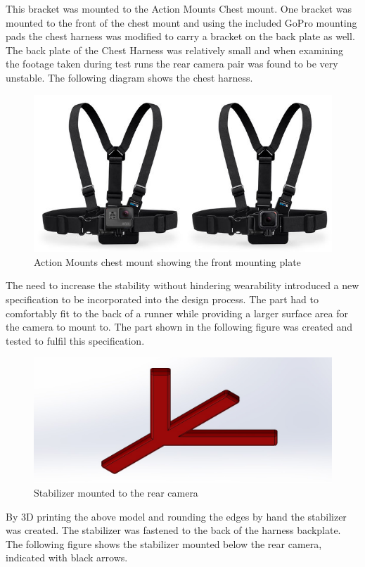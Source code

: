 This bracket was mounted to the Action Mounts Chest mount. One bracket was mounted to the front of the chest mount and using the included GoPro mounting pads the chest harness was modified to carry a bracket on the back plate as well. The back plate of the Chest Harness was relatively small and when examining the footage taken during test runs the rear camera pair was found to be very unstable. The following diagram shows the chest harness.

\begin{figure}[!ht] 
\captionsetup{width=0.8\linewidth, font=small}  
\includegraphics[width=0.6\linewidth]{figures/chesty.png}
\caption{Action Mounts chest mount showing the front mounting plate}
\label{fig:chesty}
\end{figure}

The need to increase the stability without hindering wearability introduced a new specification to be incorporated into the design process. The part had to comfortably fit to the back of a runner while providing a larger surface area for the camera to mount to. The part shown in the following figure was created and tested to fulfil this specification.

\begin{figure}[!ht] 
\captionsetup{width=0.8\linewidth, font=small}  
\includegraphics[width=1\linewidth]{figures/stabil.JPG}
\caption{Stabilizer mounted to the rear camera}
\label{fig:stabil}
\end{figure}

By 3D printing the above model and rounding the edges by hand the stabilizer was created. The stabilizer was fastened to the back of the harness backplate. The following figure shows the stabilizer mounted below the rear camera, indicated with black arrows.

